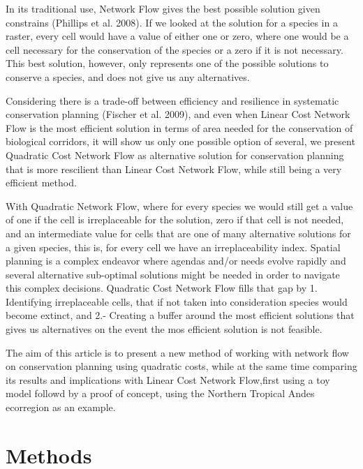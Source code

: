 \documentclass[]{article}
\begin{document}
In its traditional use, Network Flow gives the best possible solution given constrains (Phillips et al. 2008). If we looked at the solution for a species in a raster, every cell would have a value of either one or zero, where one would be a cell necessary for the conservation of the species or a zero if it is not necessary. This best solution, however, only represents one of the possible solutions to conserve a species, and does not give us any alternatives.

Considering there is a trade-off between efficiency and resilience in systematic conservation planning (Fischer et al. 2009), and even when Linear Cost Network Flow is the most efficient solution in terms of area needed for the conservation of biological corridors, it will show us only one possible option of several, we present Quadratic Cost Network Flow as alternative solution for conservation planning that is more rescilient than Linear Cost Network Flow, while still being a very efficient method.

With Quadratic Network Flow, where for every species we would still get a value of one if the cell is irreplaceable for the solution, zero if that cell is not needed, and an intermediate value for cells that are one of many alternative solutions for a given species, this is, for every cell we have an irreplaceability index. Spatial planning is a complex endeavor where agendas and/or needs evolve rapidly and several alternative sub-optimal solutions might be needed in order to navigate this complex decisions. Quadratic Cost Network Flow fills that gap by 1. Identifying irreplaceable cells, that if not taken into consideration species would become extinct, and 2.- Creating a buffer around the most efficient solutions that gives us alternatives on the event the mos efficient solution is not feasible.

The aim of this article is to present a new method of working with network flow on conservation planning using quadratic costs, while at the same time comparing its results and implications with Linear Cost Network Flow,first using a toy model followd by a proof of concept, using the Northern Tropical Andes ecorregion as an example.

\hypertarget{methods}{%
\section{Methods}\label{methods}}
\end{document}

